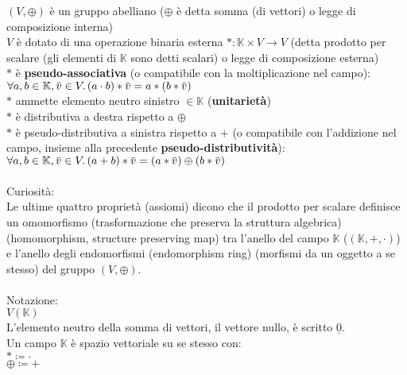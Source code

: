 \documentclass[a4paper, twoside, italian, 11pt]{book}
\newcommand{\overbar}[1] {\mkern 1.5mu\overline{\mkern-1.5mu#1\mkern-1.5mu}\mkern 1.5mu}
\newcommand{\K}{\mathbb K}
\begin{document}
\noindent
$(V, \oplus)$ è un gruppo abelliano ($\oplus$ è detta somma (di vettori) o legge di composizione interna) \\

\noindent
$V$ è dotato di una operazione binaria esterna $* : \K \times V \rightarrow V$ (detta prodotto per scalare (gli elementi di $\K$ sono detti scalari) o legge di composizione esterna) \\

\noindent
$*$ è \textbf{pseudo-associativa} (o compatibile con la moltiplicazione nel campo): \\
\indent
$\forall a, b \in \K, \overbar v \in V \ldotp (a \cdot b) * \overbar v = a * (b * \overbar v)$ \\

\noindent
$*$ ammette elemento neutro sinistro $\in \K$ (\textbf{unitarietà}) \\

\noindent
$*$ è distributiva a destra rispetto a $\oplus$ \\

\noindent
$*$ è pseudo-distributiva a sinistra rispetto a $+$ (o compatibile con l'addizione nel campo, insieme alla precedente \textbf{pseudo-distributività}): \\
\indent
$\forall a, b \in \K, \overbar v \in V \ldotp (a + b) * \overbar v = (a * \overbar v) \oplus (b * \overbar v)$ \\\\


\noindent
Curiosità: \\
Le ultime quattro proprietà (assiomi) dicono che il prodotto per scalare definisce un omomorfismo (trasformazione che preserva la struttura algebrica) (homomorphism, structure preserving map) tra l'anello del campo $\K$ ($(\K, +, \cdot)$) e l'anello degli endomorfismi (endomorphism ring) (morfismi da un oggetto a se stesso) del gruppo $(V, \oplus)$. \\\\

\noindent
Notazione: \\
\indent
$V(\K)$ \\
L'elemento neutro della somma di vettori, il vettore nullo, è scritto $\underline 0$. \\

\noindent
Un campo $\K$ è spazio vettoriale su se stesso con: \\
\indent
$* \coloneqq \cdot$ \\
\indent
$\oplus \coloneqq +$\\
\end{document}
